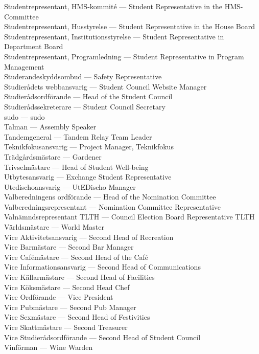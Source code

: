 \documentclass{dsekkallelse}
\begin{document}
Studentrepresentant, HMS-kommité ---	Student Representative in the HMS-Committee\\
Studentrepresentant, Husstyrelse ---	Student Representative in the House Board\\
Studentrepresentant, Institutionsstyrelse ---	Student Representative in Department Board\\
Studentrepresentant, Programledning ---	Student Representative in Program Management\\
Studerandeskyddsombud ---	Safety Representative\\
Studierådets webbansvarig ---	Student Council Website Manager\\
Studierådsordförande ---	Head of the Student Council\\
Studierådssekreterare ---	Student Council Secretary\\
sudo ---	sudo\\
Talman ---	Assembly Speaker\\
Tandemgeneral ---	Tandem Relay Team Leader\\
Teknikfokusansvarig ---	Project Manager, Teknikfokus\\
Trädgårdsmästare ---	Gardener\\
Trivselmästare ---	Head of Student Well-being\\
Utbytesansvarig ---	Exchange Student Representative\\
Utedischoansvarig ---	UtEDischo Manager\\
Valberedningens ordförande ---	Head of the Nomination Committee\\
Valberedningsrepresentant ---	Nomination Committee Representative\\
Valnämndsrepresentant TLTH ---	Council Election Board Representative TLTH\\
Världsmästare ---	World Master\\
Vice Aktivitetsansvarig --- Second Head of Recreation\\
Vice Barmästare ---	Second Bar Manager\\
Vice Cafémästare ---	Second Head of the Café\\
Vice Informationsansvarig ---	Second Head of Communications\\
Vice Källarmästare ---	Second Head of Facilities\\
Vice Köksmästare ---	Second Head Chef\\
Vice Ordförande ---	Vice President\\
Vice Pubmästare ---	Second Pub Manager\\
Vice Sexmästare ---	Second Head of Festivities\\
Vice Skattmästare ---	Second Treasurer\\
Vice Studierådsordförande ---	Second Head of Student Council\\
Vinförman ---	Wine Warden\\
\end{document}
